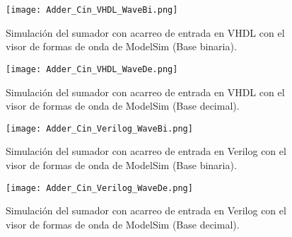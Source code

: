 \begin{figure}[ht]
	\centering
	\texttt{[image: Adder\_Cin\_VHDL\_WaveBi.png]}
	\caption{Simulación del sumador con acarreo de entrada en VHDL con el visor de formas de onda de ModelSim (Base binaria). \label{fig:adder_cin_vhdl_WaveBi}}
\end{figure}

\begin{figure}[ht]
	\centering
	\texttt{[image: Adder\_Cin\_VHDL\_WaveDe.png]}
	\caption{Simulación del sumador con acarreo de entrada en VHDL con el visor de formas de onda de ModelSim (Base decimal). \label{fig:adder_cin_vhdl_WaveDe}}
\end{figure}

\begin{figure}[ht]
	\centering
	\texttt{[image: Adder\_Cin\_Verilog\_WaveBi.png]}
	\caption{Simulación del sumador con acarreo de entrada en Verilog con el visor de formas de onda de ModelSim (Base binaria). \label{fig:adder_cin_verilog_WaveBi}}
\end{figure}

\begin{figure}[ht]
	\centering
	\texttt{[image: Adder\_Cin\_Verilog\_WaveDe.png]}
	\caption{Simulación del sumador con acarreo de entrada en Verilog con el visor de formas de onda de ModelSim (Base decimal). \label{fig:adder_cin_verilog_WaveDe}}
\end{figure}
